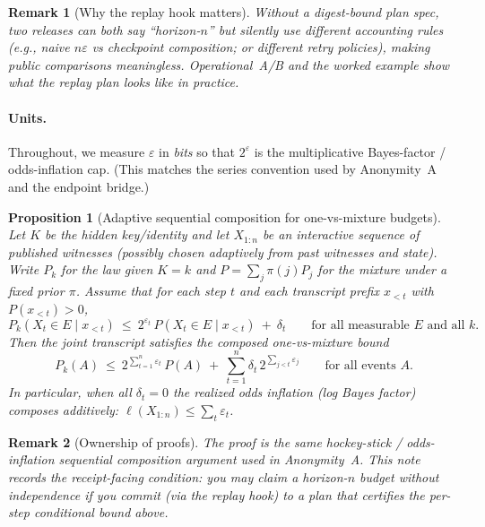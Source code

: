 \documentclass[11pt]{article}
\newtheorem{proposition}{Proposition}
\newtheorem{remark}{Remark}
\newcommand{\eps}{\varepsilon}
\begin{document}
\begin{remark}[Why the replay hook matters]
Without a digest-bound plan spec, two releases can both say ``horizon-$n$'' but silently use different accounting rules (e.g., naive $n\eps$ vs checkpoint composition; or different retry policies), making public comparisons meaningless.
Operational~A/B and the worked example show what the replay plan looks like in practice.\cite{series:operationalA,series:operationalB,series:workedexample}
\end{remark}

\paragraph{Units.}
Throughout, we measure $\eps$ in \emph{bits} so that $2^{\eps}$ is the multiplicative Bayes-factor / odds-inflation cap.
(This matches the series convention used by Anonymity~A and the endpoint bridge.)\cite{series:oddsinflation}

\begin{proposition}[Adaptive sequential composition for one-vs-mixture budgets]\label{prop:adaptivecomp}
Let $K$ be the hidden key/identity and let $X_{1:n}$ be an interactive sequence of published witnesses (possibly chosen adaptively from past witnesses and state).
Write $P_k$ for the law given $K=k$ and $P=\sum_{j}\pi(j)P_j$ for the mixture under a fixed prior $\pi$.
Assume that for each step $t$ and each transcript prefix $x_{<t}$ with $P(x_{<t})>0$,
\[
P_k(X_t\in E\mid x_{<t})\ \le\ 2^{\eps_t}\,P(X_t\in E\mid x_{<t})\ +\ \delta_t
\qquad\text{for all measurable }E\text{ and all }k.
\]
Then the joint transcript satisfies the composed one-vs-mixture bound
\[
P_k(A)\ \le\ 2^{\sum_{t=1}^n\eps_t}\,P(A)\ +\ \sum_{t=1}^n \delta_t\,2^{\sum_{j<t}\eps_j}
\qquad\text{for all events }A.
\]
In particular, when all $\delta_t=0$ the realized odds inflation (log Bayes factor) composes additively: $\ell(X_{1:n})\le\sum_t\eps_t$.
\end{proposition}

\begin{remark}[Ownership of proofs]
The proof is the same hockey-stick / odds-inflation sequential composition argument used in Anonymity~A.\cite{series:oddsinflation}
This note records the \emph{receipt-facing condition}: you may claim a horizon-$n$ budget without independence if you commit (via the replay hook) to a plan that certifies the per-step conditional bound above.
\end{remark}
\end{document}
